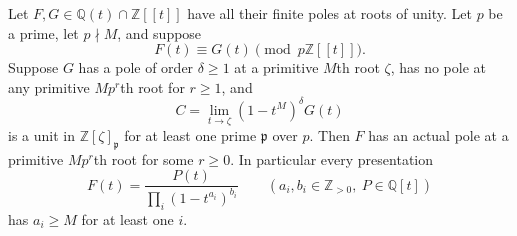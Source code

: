 \begin{theorem}
Let $F,G\in\mathbb Q(t)\cap\mathbb Z[[t]]$ have all their
finite poles at roots of unity. Let $p$ be a prime, let
$p\nmid M$, and suppose
\[
                  F(t)\equiv G(t)\pmod{p\mathbb Z[[t]]}.
 \tag{PNEW-M3}
\]
Suppose $G$ has a pole of order $\delta\ge1$ at a primitive
$M$th root $\zeta$, has no pole at any primitive
$Mp^r$th root for $r\ge1$, and
\[
 C=\lim_{t\longrightarrow\zeta}(1-t^M)^\delta G(t)
 \tag{PNEW-M4}
\]
is a unit in $\mathbb Z[\zeta]_{\mathfrak p}$ for at least
one prime $\mathfrak p$ over $p$.
Then $F$ has an actual pole at a primitive $Mp^r$th root for
some $r\ge0$. In particular every presentation
\[
                  F(t)=\frac{P(t)}{\prod_i(1-t^{a_i})^{b_i}}
 \qquad(a_i,b_i\in\mathbb Z_{>0},\ P\in\mathbb Q[t])
 \tag{PNEW-M5}
\]
has $a_i\ge M$ for at least one $i$.
\end{theorem}
